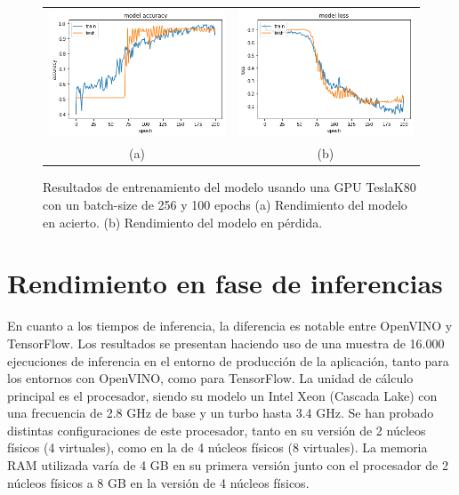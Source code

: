 \begin{figure}
    \centering
    \begin{tabular}{cc}
        \includegraphics[height=0.35\textwidth]{images/chapter5/batch_256_200_epoch.png} &
        \includegraphics[height=0.35\textwidth]{images/chapter5/batch_256_200_epoch_loss.png}\\
        (a) & (b)\\
    \end{tabular}
    \label{fig:Resultados de entrenamiento con un batch-size de 256 y 200 epochs}
    \caption{Resultados de entrenamiento del modelo usando una GPU TeslaK80 con un batch-size de 256 y 100 epochs (a) Rendimiento del modelo en acierto. (b) Rendimiento del modelo en pérdida.}
\end{figure}


\section{Rendimiento en fase de inferencias}\label{sec:ren-dimiento-en-fase-de-inferencias}
En cuanto a los tiempos de inferencia, la diferencia es notable entre OpenVINO y TensorFlow.
Los resultados se presentan haciendo uso de una muestra de 16.000 ejecuciones de inferencia en el entorno de producción de la aplicación, tanto para los entornos con OpenVINO, como para TensorFlow.
La unidad de cálculo principal es el procesador, siendo su modelo un Intel Xeon (Cascada Lake) con una frecuencia de 2.8 GHz de base y un turbo hasta 3.4 GHz.
Se han probado distintas configuraciones de este procesador, tanto en su versión de 2 núcleos físicos (4 virtuales), como en la de 4 núcleos físicos (8 virtuales).
La memoria RAM utilizada varía de 4 GB en su primera versión junto con el procesador de 2 núcleos físicos a 8 GB en la versión de 4 núcleos físicos.

